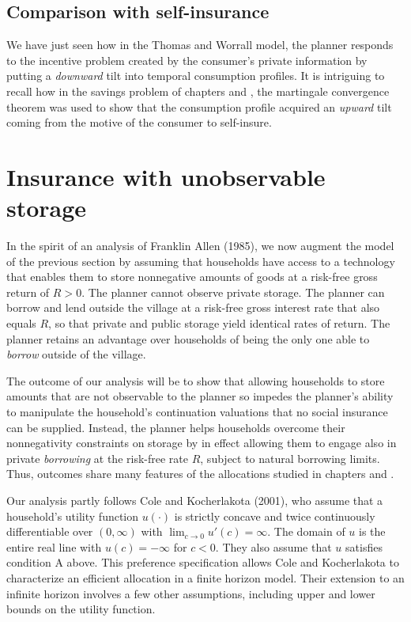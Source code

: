 \subsection{Comparison with self-insurance}

  We have just seen how in the Thomas and Worrall model, the planner
responds to the incentive problem created by
the consumer's private information by putting a
 {\it downward\/} tilt into temporal  consumption profiles.   It is
intriguing to recall how in the savings problem of
chapters  and , the
martingale  convergence theorem was used to show that
the consumption profile acquired an {\it upward\/} tilt coming
from the motive of the consumer to self-insure.


\section{Insurance with unobservable storage}
%
%
In the spirit of an analysis of  Franklin Allen (1985), we now augment the model of the
previous section by assuming that households have access to a
technology that enables them to store nonnegative amounts of goods
at a risk-free gross return of $R>0$. The planner cannot observe
private storage. The planner can borrow and lend outside the
village at a risk-free gross interest rate that also equals $R$, so
that private and public storage yield identical rates of return.
The planner retains an advantage over households of being the
only one able to {\it borrow\/} outside of the village.

The outcome of our analysis will be to show that allowing households
to store amounts that are not observable to the planner so impedes
the planner's ability to manipulate the household's continuation
valuations that no social insurance can be supplied.  Instead,
the planner helps households overcome their  nonnegativity constraints
on  storage by in effect allowing them to engage also
in private {\it borrowing\/} at the risk-free rate $R$, subject to natural
borrowing limits. Thus, outcomes share many features of the allocations
studied in chapters  and .

Our analysis partly follows Cole and Kocherlakota (2001),
%
who assume that a household's utility function $u(\cdot)$ is strictly
concave and twice continuously differentiable over $(0,\infty)$
with $\lim_{c\rightarrow 0}u'(c)=\infty$. The domain of $u$
is the entire real line with $u(c)=-\infty$ for
$c<0$. They also
assume that $u$ satisfies condition A above. This preference specification
allows Cole and Kocherlakota to characterize an  efficient allocation in
a finite horizon model. Their extension to an infinite horizon
involves a few other assumptions, including upper and lower
bounds on the utility function.

